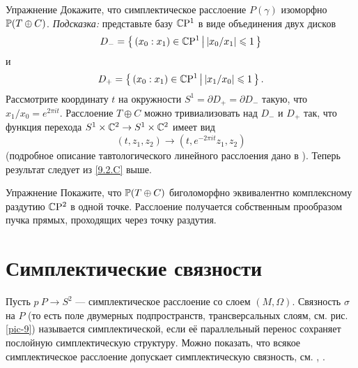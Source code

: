 \begin{ex}{Упражнение}\label{9.2.D}
Докажите, что симплектическое расслоение $P(\gamma)$ изоморфно $\mathbb{P}(T
\oplus C)$. 
\emph{Подсказка:} представьте базу $\mathbb{C}\mathrm{P}^1$ в виде объединения двух дисков
\[D_- = \left\{ \,{(x_0 : x_1 ) \in \mathbb{C}\mathrm{P}^1}\, \middle| \,{ |x_0 /x_1 | \leqslant 1}\, \right\}\]
и
\[D_+ = \left\{ \,{(x_0 : x_1 ) \in \mathbb{C}\mathrm{P}^1}\, \middle| \,{|x_1 /x_0 | \leqslant 1}\, \right\}.\]
Рассмотрите координату $t$ на окружности $S^1 = \partial D_+ =
\partial D_-$ такую, что $x_1 /x_0 = e^{2\pi it}$. 
Расслоение $T \oplus C$ можно тривиализовать над $D_-$ и $D_+$ так,
что функция перехода $S^1 \times \mathbb{C}^2 \to S^1 \times \mathbb{C}^2$ имеет вид  
\[(t, z_1, z_2 ) \to (t, e^{-2\pi it} z_1, z_2 )\]
(подробное описание тавтологического линейного расслоения дано в
\cite{GH}). 
Теперь результат следует из \ref{9.2.C} выше.
\end{ex}

\begin{ex}{Упражнение}\label{9.2.E}
Покажите, что $\mathbb{P}(T \oplus C)$ биголоморфно эквивалентно комплексному
раздутию $\mathbb{C}\mathrm{P}^2$ в одной точке. 
Расслоение получается собственным прообразом пучка прямых, проходящих
через точку раздутия. 
\end{ex}

\section{Симплектические связности}

Пусть $p\: P\to S^2$ --- симплектическое расслоение со слоем $(M,\Omega)$.
Связность $\sigma$ на $P$ (то есть поле двумерных подпространств,
трансверсальных слоям, см. рис. \ref{pic-9}) называется
симплектической, если её параллельный перенос сохраняет послойную
симплектическую структуру. 
Можно показать, что всякое симплектическое расслоение допускает
симплектическую связность, см. \cite{GLS}, \cite{MS}. 

